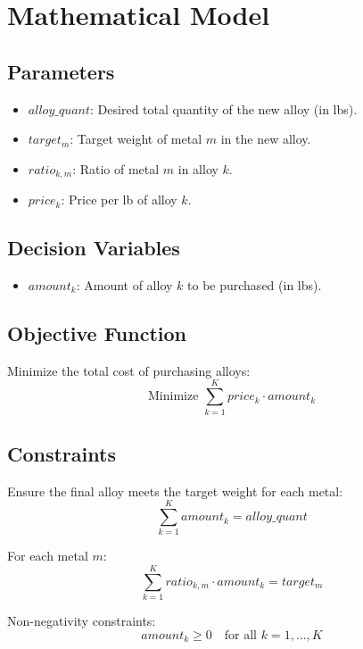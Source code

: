 \documentclass{article}
\begin{document}
\section*{Mathematical Model}

\subsection*{Parameters}
\begin{itemize}
    \item $alloy\_quant$: Desired total quantity of the new alloy (in lbs).
    \item $target_m$: Target weight of metal $m$ in the new alloy.
    \item $ratio_{k,m}$: Ratio of metal $m$ in alloy $k$.
    \item $price_k$: Price per lb of alloy $k$.
\end{itemize}

\subsection*{Decision Variables}
\begin{itemize}
    \item $amount_k$: Amount of alloy $k$ to be purchased (in lbs).
\end{itemize}

\subsection*{Objective Function}
Minimize the total cost of purchasing alloys:
\[
\text{Minimize } \sum_{k=1}^{K} price_k \cdot amount_k
\]

\subsection*{Constraints}
Ensure the final alloy meets the target weight for each metal:
\[
\sum_{k=1}^{K} amount_k = alloy\_quant
\]

For each metal $m$:
\[
\sum_{k=1}^{K} ratio_{k,m} \cdot amount_k = target_m
\]

Non-negativity constraints:
\[
amount_k \geq 0 \quad \text{for all } k = 1, \ldots, K
\]
\end{document}
